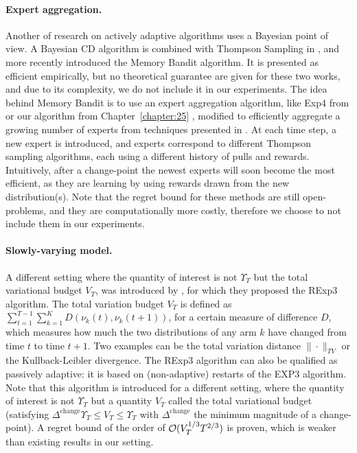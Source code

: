 \paragraph{Expert aggregation.}
%
Another of research on actively adaptive algorithms uses a Bayesian point of view.
A Bayesian CD algorithm is combined with Thompson Sampling in \cite{MellorShapiro13},
and more recently \cite{Alami17} introduced the Memory Bandit algorithm.
It is presented as efficient empirically, but no theoretical guarantee are given for these two works, and due to its complexity, we do not include it in our experiments.
The idea behind Memory Bandit is to use an expert aggregation algorithm, like Exp4 from \cite{Auer02} or our \Aggr{} algorithm from Chapter~\ref{chapter:25} \cite{Besson2018WCNC}, modified to efficiently aggregate a growing number of experts from techniques presented in \cite{Mourtada17}.
At each time step, a new expert is introduced, and experts correspond to different Thompson sampling algorithms, each using a different history of pulls and rewards. Intuitively, after a change-point the newest experts will soon become the most efficient, as they are learning by using rewards drawn from the new distribution(s).
%
Note that the regret bound for these methods are still open-problems,
and they are computationally more costly,
therefore we choose to not include them in our experiments.


\paragraph{Slowly-varying model.}

A different setting where the quantity of interest is not $\Upsilon_T$ but the total variational budget $V_T$, was introduced by \cite{Besbes14stochastic}, for which they proposed the RExp3 algorithm.
The total variation budget $V_T$ is defined as $\sum_{t=1}^{T-1} \sum_{k=1}^K D(\nu_k(t), \nu_k(t+1))$, for a certain measure of difference $D$, which measures how much the two distributions of any arm $k$ have changed from time $t$ to time $t+1$.
Two examples can be the total variation distance $\|\cdot\|_{TV}$ or the Kullback-Leibler divergence.
%
The RExp3 algorithm can also be qualified as passively adaptive: it is based on (non-adaptive) restarts of the EXP3 algorithm. Note that this algorithm is introduced for a different setting, where the quantity of interest is not $\Upsilon_T$ but a quantity $V_T$ called the total variational budget (satisfying $\Delta^{\text{change}} \Upsilon_T \leq V_T \leq \Upsilon_T$ with $\Delta^{\text{change}}$ the minimum magnitude of a change-point).
A regret bound of the order of $\mathcal{O}(V_T^{1/3} T^{2/3})$ is proven, which is weaker than existing results in our setting.

